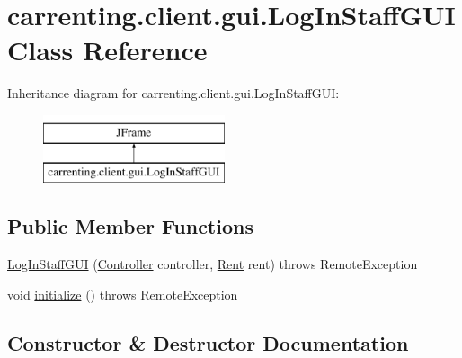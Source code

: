 \hypertarget{classcarrenting_1_1client_1_1gui_1_1_log_in_staff_g_u_i}{}\section{carrenting.\+client.\+gui.\+Log\+In\+Staff\+G\+UI Class Reference}
\label{classcarrenting_1_1client_1_1gui_1_1_log_in_staff_g_u_i}
Inheritance diagram for carrenting.\+client.\+gui.\+Log\+In\+Staff\+G\+UI\+:\begin{figure}[H]
\begin{center}
\leavevmode
\includegraphics[height=2.000000cm]{classcarrenting_1_1client_1_1gui_1_1_log_in_staff_g_u_i}
\end{center}
\end{figure}
\subsection*{Public Member Functions}
\begin{DoxyCompactItemize}
\item 
\mbox{\hyperlink{classcarrenting_1_1client_1_1gui_1_1_log_in_staff_g_u_i_a6a80d5e9af6a2f162bc44c2a43936d73}{Log\+In\+Staff\+G\+UI}} (\mbox{\hyperlink{classcarrenting_1_1client_1_1_controller}{Controller}} controller, \mbox{\hyperlink{classcarrenting_1_1server_1_1jdo_1_1_rent}{Rent}} rent)  throws Remote\+Exception
\item 
void \mbox{\hyperlink{classcarrenting_1_1client_1_1gui_1_1_log_in_staff_g_u_i_a47b35e476216e26fe89235fee12150e1}{initialize}} ()  throws Remote\+Exception 
\end{DoxyCompactItemize}


\subsection{Constructor \& Destructor Documentation}
\mbox{\label{classcarrenting_1_1client_1_1gui_1_1_log_in_staff_g_u_i_a6a80d5e9af6a2f162bc44c2a43936d73}} 
